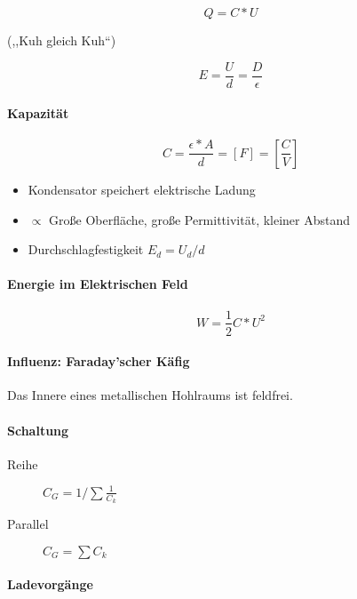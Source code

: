 
$$Q = C * U$$

(,,Kuh gleich Kuh``)

$$E = \frac{U}{d} = \frac{D}{\epsilon}$$

\paragraph{Kapazität}

$$C = \frac{\epsilon * A}{d} = [F] = \left[\frac{C}{V}\right]$$

\begin{itemize}
  \item Kondensator speichert elektrische Ladung
  \item $\propto$ Gro\ss e Oberfläche, gro\ss e Permittivität, kleiner Abstand
  \item Durchschlagfestigkeit $E_d = U_d / d$
\end{itemize}

\paragraph{Energie im Elektrischen Feld}

$$W = \frac{1}{2} C * U^2$$

\paragraph{Influenz: Faraday'scher Käfig}
Das Innere eines metallischen Hohlraums ist feldfrei.

\paragraph{Schaltung}

\begin{description}
  \item[Reihe] $C_G = 1/{\sum \frac{1}{C_k}}$
  \item[Parallel] $C_G = \sum C_k$
\end{description}

\paragraph{Ladevorgänge}

